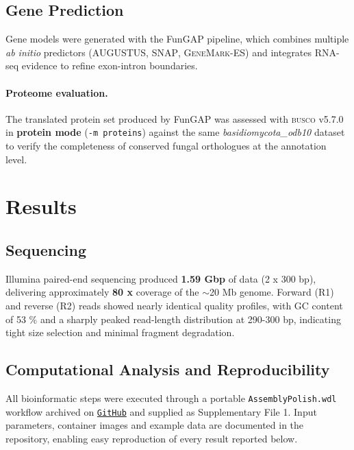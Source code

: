\documentclass[Journal,letterpaper]{ascelike-new}
\begin{document}
\subsection*{Gene Prediction}

Gene models were generated with the FunGAP pipeline, which combines multiple \textit{ab initio} predictors (\textsc{AUGUSTUS}, \textsc{SNAP}, \textsc{GeneMark-ES}) and integrates RNA-seq evidence to refine exon-intron boundaries.

\paragraph{Proteome evaluation.} The translated protein set produced by FunGAP was assessed with \textsc{busco} v5.7.0 in \textbf{protein mode} (\texttt{-m proteins}) against the same \textit{basidiomycota\_odb10} dataset to verify the completeness of conserved fungal orthologues at the annotation level.

\section*{Results}

\subsection*{Sequencing}

Illumina paired-end sequencing produced \textbf{1.59 Gbp} of data (2 x 300 bp), delivering approximately \textbf{80 x} coverage of the \(\sim\)20 Mb genome. Forward (R1) and reverse (R2) reads showed nearly identical quality profiles, with GC content of 53 \% and a sharply peaked read-length distribution at 290-300 bp, indicating tight size selection and minimal fragment degradation.

\subsection*{Computational Analysis and Reproducibility}

All bioinformatic steps were executed through a portable \texttt{AssemblyPolish.wdl} workflow archived on \href{https://github.com/lmtani/s-scitamineum-pipelines}{\texttt{GitHub}} and supplied as Supplementary File 1.  Input parameters, container images and example data are documented in the repository, enabling easy reproduction of every result reported below.
\end{document}
